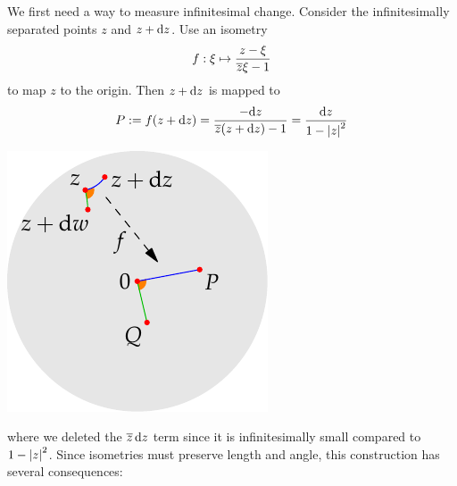 \begin{minipage}[t]{0.69\linewidth}\vspace{0pt}
	We first need a way to measure infinitesimal change. Consider the infinitesimally separated points $z$ and $z+{\mathrm{d} z}$. Use an isometry
	\[
		f:\xi\mapsto \frac{z-\xi}{\overline{z}\xi-1}
	\]
	to map $z$ to the origin. Then $z+{\mathrm{d} z}$ is mapped to
	\[
		P:=f(z+{\mathrm{d} z})=\frac{-{\mathrm{d} z}}{\overline{z}(z+{\mathrm{d} z})-1} =\frac{{\mathrm{d} z}}{1-\left| z\right|^2}
	\]
\end{minipage}
\hfill
\begin{minipage}[t]{0.3\linewidth}\vspace{-15pt}
	\flushright\includegraphics{isom-arclength}
\end{minipage}\par
where we deleted the $\overline{z}\,{\mathrm{d} z}$ term since it is infinitesimally small compared to $1-\left| z\right|^2$.\smallbreak
Since isometries must preserve length and angle, this construction has several consequences:
